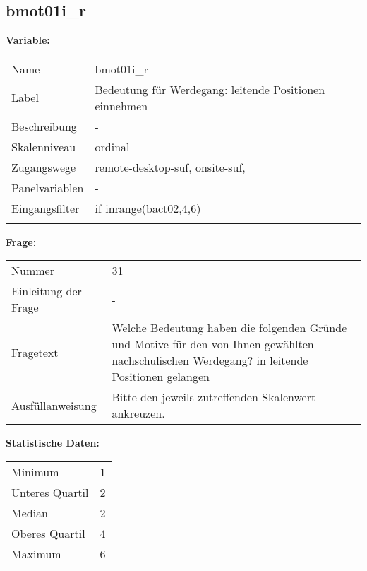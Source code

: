 	
	
	\subsection{bmot01i\_r}
	\label{subSection:bmot01i_r}

	\noindent\textbf{Variable:}\\
		\begin{tabular}{lL{11.3cm}}
			\label{tableVariable:bmot01i_r}
			Name & bmot01i\_r \\
			Label & Bedeutung für Werdegang: leitende Positionen einnehmen \\
			Beschreibung & - \\
			Skalenniveau & ordinal \\
			Zugangswege &
				remote-desktop-suf,
				onsite-suf,
 \\
			Panelvariablen & -
			 \\
			Eingangsfilter & if inrange(bact02,4,6)  \\
 \\
		\end{tabular}

		\vspace*{1 cm}
		\noindent\textbf{Frage:}\\
		\begin{tabular}{lL{11.3cm}}
			\label{tableQuestion:bmot01i_r}
			Nummer & 31 \\
			Einleitung der Frage & - \\
			Fragetext & Welche Bedeutung haben die folgenden Gründe und Motive für den von Ihnen gewählten nachschulischen Werdegang?
in leitende Positionen gelangen \\
			Ausfüllanweisung & Bitte den jeweils zutreffenden Skalenwert ankreuzen. \\
		\end{tabular}


		\vspace*{1 cm}
		\noindent\textbf{Statistische Daten:}\\
			\begin{tabular}{ll}
				\label{tableStatistics:bmot01i_r}
					Minimum & 1 \\
					Unteres Quartil & 2 \\
					Median & 2 \\
					Oberes Quartil & 4 \\
					Maximum & 6 \\
			\end{tabular}



